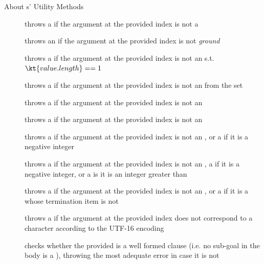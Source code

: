 \documentclass[presentation]{beamer}\mode<presentation>{\usetheme{AMSBolognaFC}}
\begin{document}
\begin{frame}[allowframebreaks]{About s' Utility Methods}
\begin{description}
        \item[] throws a  if the argument at the provided index is not a 
        \item[] throws an  if the argument at the provided index is not \emph{ground}
        \item[] throws a  if the argument at the provided index is not an  s.t. $\kt{value.length} == 1$
        \item[] throws a  if the argument at the provided index is not an  from the set 
        \item[] throws a  if the argument at the provided index is not an 
        \item[] throws a  if the argument at the provided index is not an 
        \item[] throws a  if the argument at the provided index is not an , or a  if it is a negative integer
        \item[] throws a  if the argument at the provided index is not an , a  if it is a negative integer, or a  is it is an integer greater than 
        \item[] throws a  if the argument at the provided index is not an , or a  if it is a  whose termination item is not \pl{[]}
        \item[] throws a  if the argument at the provided index does not correspond to a character according to the UTF-16 encoding
        \item[] checks whether the provided  is a well formed clause (i.e. no sub-goal in the body is a ), throwing the most adequate error in case it is not

\end{description}
\end{frame}
\end{document}
